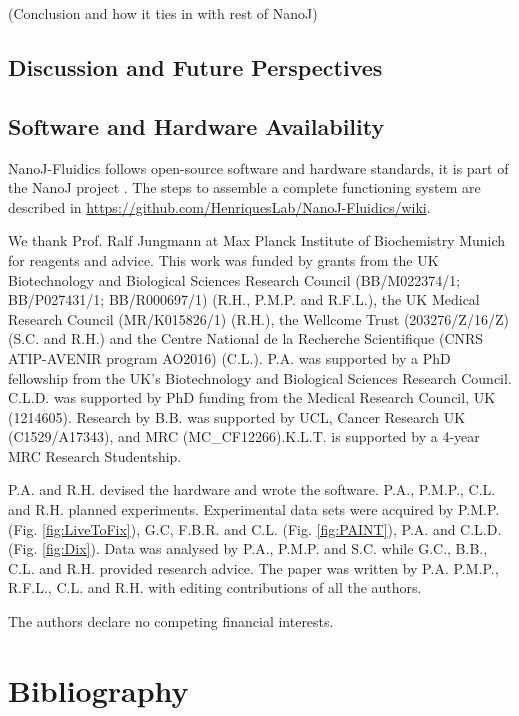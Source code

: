 (Conclusion and how it ties in with rest of NanoJ)

\subsection*{Discussion and Future Perspectives}
\Blindtext

\subsection*{Software and Hardware Availability}
NanoJ-Fluidics follows open-source software and hardware standards, it is part of the NanoJ project \cite{gustafsson2016fast, culley2018quantitative,gray2016virus}. The steps to assemble a complete functioning system are described in \href{https://github.com/HenriquesLab/NanoJ-Fluidics/wiki}{https://github.com/HenriquesLab/NanoJ-Fluidics/wiki}. 

\begin{acknowledgements}
    We thank Prof. Ralf Jungmann at Max Planck Institute of Biochemistry Munich for reagents and advice. This work was funded by grants from the UK Biotechnology and Biological Sciences Research Council (BB/M022374/1; BB/P027431/1; BB/R000697/1) (R.H., P.M.P. and R.F.L.), the UK Medical Research Council (MR/K015826/1) (R.H.), the Wellcome Trust (203276/Z/16/Z) (S.C. and R.H.) and the Centre National de la Recherche Scientifique (CNRS ATIP-AVENIR program AO2016) (C.L.). P.A. was supported by a PhD fellowship from the UK’s Biotechnology and Biological Sciences Research Council. C.L.D. was supported by PhD funding from the Medical Research Council, UK (1214605). Research by B.B. was supported by UCL, Cancer Research UK (C1529/A17343), and MRC (MC\_CF12266).K.L.T. is supported
    by a 4-year MRC Research Studentship.
\end{acknowledgements}


\begin{contributions}
    P.A. and R.H. devised the hardware and wrote the software. P.A., P.M.P., C.L. and R.H. planned experiments. Experimental data sets were acquired by P.M.P. (Fig. \ref{fig:LiveToFix}), G.C, F.B.R. and C.L. (Fig. \ref{fig:PAINT}), P.A. and C.L.D. (Fig. \ref{fig:Dix}). Data was analysed by P.A., P.M.P. and S.C. while G.C., B.B., C.L. and R.H. provided research advice. The paper was written by P.A. P.M.P., R.F.L., C.L. and R.H. with editing contributions of all the authors.
\end{contributions}

\begin{interests}
    The authors declare no competing financial interests.
\end{interests}

\section*{Bibliography}



